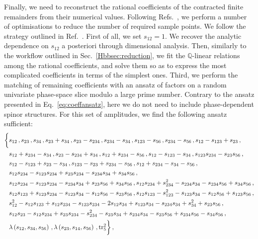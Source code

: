 \documentclass[main.tex]{subfiles}
\begin{document}
Finally, we need to reconstruct the rational coefficients of the contracted finite remainders from their numerical values. Following Refs.~\cite{Abreu:2018zmy,Badger:2021nhg,Badger:2021imn,Badger:2021ega}, we perform a number of optimisations to reduce the number of required sample points. We follow the strategy outlined in Ref.~\cite{Badger:2021imn}. First of all, we set $s_{12}=1$. We recover the analytic dependence on $s_{12}$ a posteriori through dimensional analysis. Then, similarly to the workflow outlined in Sec.~\ref{Hbbsec:reduction}, we fit the $\mathbb{Q}$-linear relations among the rational coefficients, and solve them so as to express the most complicated coefficients in terms of the simplest ones. Third, we perform the matching of remaining coefficients with an ansatz of factors on a random univariate phase-space slice modulo a large prime number. Contrary to the ansatz presented in Eq.~\ref{eq:coeffansatz}, here we do not need to include phase-dependent spinor structures. For this set of amplitudes, we find the following ansatz sufficient:
\begin{align} \label{Wyjeq:coeffansatz}
\begin{aligned} 
\biggl\{ & s_{12}\,, s_{23}\,, s_{34}\,, s_{23} + s_{34}\,, s_{23} - s_{234}\,, s_{234} - s_{34}\,, s_{123} - s_{56}\,, s_{234} - s_{56}\,, s_{12} - s_{123} + s_{23}\,, \\
& s_{12} + s_{234} - s_{34} \,, s_{23} - s_{234} + s_{34}\,, s_{12} + s_{234} - s_{56}\,, s_{12} - s_{123} - s_{34}\,, s_{123} s_{234} - s_{23} s_{56}\,, \\
& s_{12} - s_{123} + s_{23} - s_{34} \,, s_{123} - s_{23} + s_{234} - s_{56} \,, s_{12} + s_{234} - s_{34} - s_{56} \,, \\
& s_{12} s_{234} - s_{123} s_{234} + s_{23} s_{234} - s_{234} s_{34} + s_{34} s_{56} \,, \\
& s_{12} s_{234} - s_{123} s_{234} - s_{234} s_{34} + s_{23} s_{56} + s_{34} s_{56} \,, s_{12} s_{234} + s_{234}^2 - s_{234} s_{34} - s_{234} s_{56} + s_{34} s_{56} \,, \\
& s_{12} s_{123} + s_{123} s_{234} - s_{123} s_{34} - s_{12} s_{56} - s_{23} s_{56} \,, s_{12} s_{123} - s_{123}^2 - s_{123} s_{34} - s_{12} s_{56} + s_{123} s_{56} \,, \\
& s_{12}^2 - s_{12} s_{123} + s_{12} s_{234} - s_{123} s_{234} - 2 s_{12} s_{34} + s_{123} s_{34} - s_{234} s_{34} + s_{34}^2 + s_{23} s_{56} \,, \\
& s_{12} s_{23} - s_{12} s_{234} + s_{23} s_{234} - s_{234}^2 - s_{23} s_{34} + s_{234} s_{34} - s_{23} s_{56} + s_{234} s_{56} - s_{34} s_{56} \,, \\
& \lambda\left(s_{12}, s_{34}, s_{56} \right) \,, \lambda\left(s_{23}, s_{14}, s_{56}\right) \,, \operatorname{\rm tr}_5^2 \biggr\} \,,
\end{aligned}
\end{align}
\end{document}
